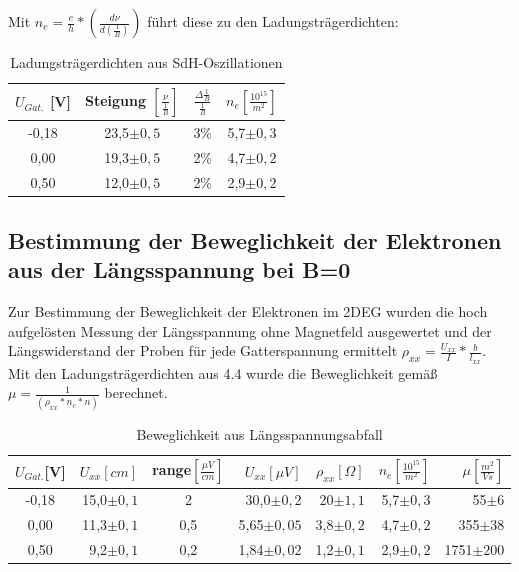 \documentclass[10pt,a4paper]{article}
\begin{document}
	  Mit $ n_e = \frac{e}{h} * (\frac{d\nu}{d\left(\frac{1}{B}\right)}) $ führt diese zu den Ladungsträgerdichten:
	\begin{table}[H]
	\caption{Ladungsträgerdichten aus SdH-Oszillationen}
\begin{center}
	 \begin{tabular}{|c|c|c|c|}
	\hline 
    $U_{Gat.}$ [V] & Steigung $\left[\frac{\nu}{\frac{1}{B}}\right]$ & $ \frac{\Delta\frac{1}{B}}{\frac{1}{B}} $ & $n_{e} \left[\frac{10^{15}}{m^2}\right]$ \\ 
	\hline \hline
	-0,18 & 23,5$ \pm0,5 $& 3\% & 5,7$ \pm0,3 $ \\ 
	\hline 
	0,00 & 19,3$ \pm0,5 $& 2\% & 4,7$ \pm0,2 $ \\ 
	\hline 
	0,50 & 12,0$ \pm0,5 $& 2\% & 2,9$ \pm0,2 $\\ 
	\hline 
	\end{tabular}
\end{center}
	\end{table}	 
	 
	\subsection{Bestimmung der Beweglichkeit der Elektronen aus der Längsspannung bei B=0}
	Zur Bestimmung der Beweglichkeit der Elektronen im 2DEG wurden die hoch aufgelösten Messung der Längsspannung ohne Magnetfeld ausgewertet und der Längswiderstand der Proben für jede Gatterspannung ermittelt $ \rho_{xx} = \frac{U_{xx}}{I} * \frac{b}{l_{xx}} $. Mit den Ladungsträgerdichten aus 4.4 wurde die Beweglichkeit gemäß $\mu = \frac{1}{(\rho_{xx} * n_e * n)}$ berechnet.
	\begin{table}[H]
	\caption{Beweglichkeit aus Längsspannungsabfall}
	\begin{tabular}{|c|r|c|r|r|r|r|}
	\hline 
    $U_{Gat.}$[V] & $U_{xx} [cm] $ & range$[\frac{\mu V}{cm}]$ & $U_{xx} [\mu V]$ & $\rho_{xx} [\Omega]$ & $ n_{e} \left[\frac{10^{15}}{m^2}\right]$ & $\mu [\frac{m^2}{Vs}]$ \\ 
	\hline \hline
	-0,18 & 15,0$ \pm0,1 $ & 2 & 30,0$ \pm0,2 $ & 20$ \pm1,1 $ & 5,7$ \pm0,3 $ & 55$ \pm 6 $ \\ 
	\hline 
	0,00 & 11,3$ \pm0,1 $ & 0,5 & 5,65$ \pm0,05 $ & 3,8$ \pm0,2 $ & 4,7$ \pm0,2 $ & 355$ \pm 38 $ \\ 
	\hline 
	0,50 & 9,2$ \pm0,1 $ & 0,2 & 1,84$ \pm0,02 $ & 1,2$ \pm0,1 $ & 2,9$ \pm0,2 $ & 1751$ \pm 200 $ \\ 
	\hline 
	\end{tabular}
	\end{table}
\end{document}
